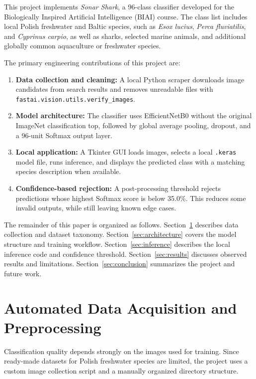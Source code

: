 \documentclass[11pt,a4paper,oneside]{article}
\begin{document}
This project implements \textit{Sonar Shark}, a 96-class classifier developed for the Biologically Inspired Artificial Intelligence (BIAI) course. The class list includes local Polish freshwater and Baltic species, such as \textit{Esox lucius}, \textit{Perca fluviatilis}, and \textit{Cyprinus carpio}, as well as sharks, selected marine animals, and additional globally common aquaculture or freshwater species.

The primary engineering contributions of this project are:
\begin{enumerate}
    \item \textbf{Data collection and cleaning:} A local Python scraper downloads image candidates from search results and removes unreadable files with \texttt{fastai.vision.utils.verify\_images}.
    \item \textbf{Model architecture:} The classifier uses EfficientNetB0 without the original ImageNet classification top, followed by global average pooling, dropout, and a 96-unit Softmax output layer.
    \item \textbf{Local application:} A Tkinter GUI loads images, selects a local \texttt{.keras} model file, runs inference, and displays the predicted class with a matching species description when available.
    \item \textbf{Confidence-based rejection:} A post-processing threshold rejects predictions whose highest Softmax score is below 35.0\%. This reduces some invalid outputs, while still leaving known edge cases.
\end{enumerate}

The remainder of this paper is organized as follows. Section~\ref{sec:data_acquisition} describes data collection and dataset taxonomy. Section~\ref{sec:architecture} covers the model structure and training workflow. Section~\ref{sec:inference} describes the local inference code and confidence threshold. Section~\ref{sec:results} discusses observed results and limitations. Section~\ref{sec:conclusion} summarizes the project and future work.

\section{Automated Data Acquisition and Preprocessing}
\label{sec:data_acquisition}

Classification quality depends strongly on the images used for training. Since ready-made datasets for Polish freshwater species are limited, the project uses a custom image collection script and a manually organized directory structure.
\end{document}
